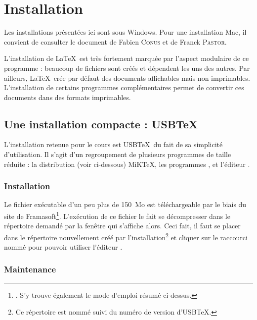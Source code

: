 
\chapter{Installation}  

Les installations présentées ici sont sous Windows. Pour une installation Mac, il convient de consulter le document de Fabien \textsc{Conus} et de Franck \textsc{Pastor}\cite{conu}.

L'installation de \LaTeX\ est très fortement marquée par l'aspect modulaire de ce programme : beaucoup de fichiers sont créés et dépendent les uns des autres. Par ailleurs, \LaTeX\ crée par défaut des documents affichables mais non imprimables. L'installation de certains programmes complémentaires permet de convertir ces documents dans des formats imprimables. 


\section{Une installation compacte : USB\TeX}

L'installation retenue pour le cours est USB\TeX\ du fait de sa simplicité d'utilisation. Il s'agit d'un regroupement de plusieurs programmes de taille réduite : la distribution (voir ci-dessous) MiK\TeX, les programmes ,  et l'éditeur .

\subsection{Installation}

Le fichier exécutable d'un peu plus de 150~Mo est téléchargeable par le biais du site de Framasoft\footnote{. S'y trouve également le mode d'emploi résumé ci-dessus.}. L'exécution de ce fichier le fait se décompresser dans le répertoire demandé par la fenêtre qui s'affiche alors. Ceci fait, il faut se placer dans le répertoire nouvellement créé par l'installation\footnote{Ce répertoire est nommé  suivi du numéro de version d'USB\TeX.} et cliquer sur le raccourci nommé   pour pouvoir utiliser l'éditeur .  

\subsection{Maintenance}

